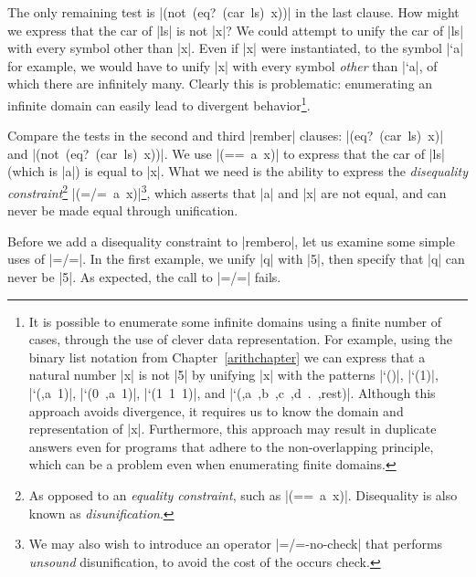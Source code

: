 The only remaining test is \mbox{\scheme|(not (eq? (car ls) x))|} in
the last clause.  How might we express that the car of
\mbox{\scheme|ls|} is not \mbox{\scheme|x|}?  We could attempt to
unify the car of \mbox{\scheme|ls|} with every symbol other than
\mbox{\scheme|x|}.  Even if \mbox{\scheme|x|} were instantiated, to the
symbol \mbox{\scheme|`a|} for example, we would have to unify
\mbox{\scheme|x|} with every symbol \emph{other} than
\mbox{\scheme|`a|}, of which there are infinitely many.  Clearly this
is problematic: enumerating an infinite domain can easily lead to
divergent behavior\footnote{It is possible to enumerate some infinite
  domains using a finite number of cases, through the use of clever
  data representation.  For example, using the binary list notation
  from Chapter~\ref{arithchapter} we can express that a natural number
  \mbox{\scheme|x|} is not \mbox{\scheme|5|} by unifying
  \mbox{\scheme|x|} with the patterns \mbox{\scheme|`()|},
  \mbox{\scheme|`(1)|}, \mbox{\scheme|`(,a 1)|}, \mbox{\scheme|`(0 ,a 1)|}, 
  \mbox{\scheme|`(1 1 1)|}, and \mbox{\scheme|`(,a ,b ,c ,d . ,rest)|}.  Although this
  approach avoids divergence, it requires us to know the domain and
  representation of \mbox{\scheme|x|}.  Furthermore, this approach may result in
  duplicate answers even for programs that adhere to the
  non-overlapping principle, which can be a problem even when
  enumerating finite domains.}.

Compare the tests in the second and third \mbox{\scheme|rember|} clauses: \mbox{\scheme|(eq? (car ls) x)|} and \mbox{\scheme|(not (eq? (car ls) x))|}.  We use \mbox{\scheme|(== a x)|} to express that
the car of \mbox{\scheme|ls|} (which is \mbox{\scheme|a|}) is equal to \mbox{\scheme|x|}.  What we need is the ability
to express the \emph{disequality constraint}\footnote{As opposed to an \emph{equality constraint}, such as \mbox{\scheme|(== a x)|}.  Disequality is also known as \emph{disunification}.} \mbox{\scheme|(=/= a x)|}\footnote{We may also wish to introduce an operator \mbox{\scheme|=/=-no-check|} that performs \emph{unsound} disunification, to avoid the cost of the occurs check.}, which
asserts that \mbox{\scheme|a|} and \mbox{\scheme|x|} are not equal, and can never be made equal
through unification.

Before we add a disequality constraint to \mbox{\scheme|rembero|}, let us examine some
simple uses of \mbox{\scheme|=/=|}.
In the first example, we unify \mbox{\scheme|q|} with
\mbox{\scheme|5|}, then specify that \mbox{\scheme|q|} can never be
\mbox{\scheme|5|}.  As expected, the call to \mbox{\scheme|=/=|}
fails.

